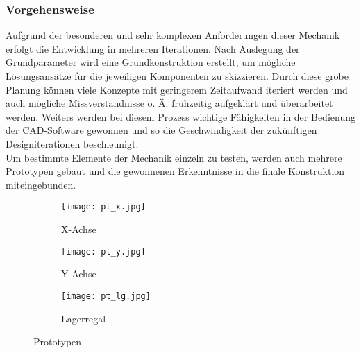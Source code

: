 \subsubsection{Vorgehensweise}
Aufgrund der besonderen und sehr komplexen Anforderungen dieser Mechanik erfolgt die Entwicklung in mehreren Iterationen. Nach Auslegung der Grundparameter wird eine Grundkonstruktion erstellt, um mögliche Lösungsansätze für die jeweiligen Komponenten zu skizzieren. Durch diese grobe Planung können viele Konzepte mit geringerem Zeitaufwand iteriert werden und auch mögliche Missverständnisse o. Ä. frühzeitig aufgeklärt und überarbeitet werden. Weiters werden bei diesem Prozess wichtige Fähigkeiten in der Bedienung der CAD-Software gewonnen und so die Geschwindigkeit der zukünftigen Designiterationen beschleunigt.\\
Um bestimmte Elemente der Mechanik einzeln zu testen, werden auch mehrere Prototypen gebaut und die gewonnenen Erkenntnisse in die finale Konstruktion miteingebunden.\\

\begin{figure}[H]
    \centering
    \begin{subfigure}{.3\textwidth}
        \centering
        \texttt{[image: pt\_x.jpg]}
        \caption{X-Achse}
        \label{pts:plt_x}
    \end{subfigure}%
    \begin{subfigure}{.3\textwidth}
        \centering
        \texttt{[image: pt\_y.jpg]}
        \caption{Y-Achse}
        \label{pts:plt_y}
    \end{subfigure}%
    \begin{subfigure}{.3\textwidth}
        \centering
        \texttt{[image: pt\_lg.jpg]}
        \caption{Lagerregal}
        \label{pts:plt_ls}
    \end{subfigure}
    \caption{Prototypen}
    \label{pts}
\end{figure}
\vspace{-3mm}

